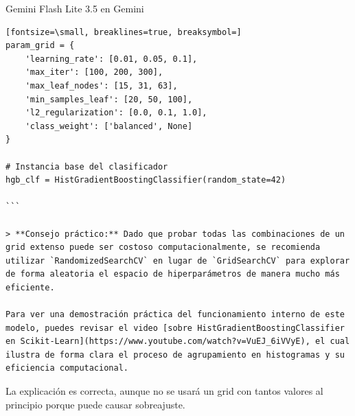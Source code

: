 \documentclass[12pt,a4paper,oneside]{book}
\begin{document}
\begin{iaresp}{Gemini Flash Lite 3.5 en Gemini}
\begin{Verbatim}[fontsize=\small, breaklines=true, breaksymbol=]
param_grid = {
    'learning_rate': [0.01, 0.05, 0.1],
    'max_iter': [100, 200, 300],
    'max_leaf_nodes': [15, 31, 63],
    'min_samples_leaf': [20, 50, 100],
    'l2_regularization': [0.0, 0.1, 1.0],
    'class_weight': ['balanced', None]
}

# Instancia base del clasificador
hgb_clf = HistGradientBoostingClassifier(random_state=42)

```

> **Consejo práctico:** Dado que probar todas las combinaciones de un grid extenso puede ser costoso computacionalmente, se recomienda utilizar `RandomizedSearchCV` en lugar de `GridSearchCV` para explorar de forma aleatoria el espacio de hiperparámetros de manera mucho más eficiente.

Para ver una demostración práctica del funcionamiento interno de este modelo, puedes revisar el video [sobre HistGradientBoostingClassifier en Scikit-Learn](https://www.youtube.com/watch?v=VuEJ_6iVVyE), el cual ilustra de forma clara el proceso de agrupamiento en histogramas y su eficiencia computacional.
\end{Verbatim}
\end{iaresp}
\begin{iaanalisis}
La explicación es correcta, aunque no se usará un grid con tantos valores al principio porque puede causar sobreajuste.
\end{iaanalisis}
\end{document}
